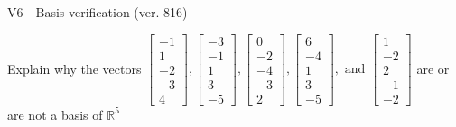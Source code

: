 \begin{exercise}
  \begin{exerciseTitle}V6 - Basis verification (ver. 816)\end{exerciseTitle}
  \begin{exerciseStatement}
    Explain why the vectors \(\left[\begin{array}{r}
-1 \\
1 \\
-2 \\
-3 \\
4
\end{array}\right] , \left[\begin{array}{r}
-3 \\
-1 \\
1 \\
3 \\
-5
\end{array}\right] , \left[\begin{array}{r}
0 \\
-2 \\
-4 \\
-3 \\
2
\end{array}\right] , \left[\begin{array}{r}
6 \\
-4 \\
1 \\
3 \\
-5
\end{array}\right] , \text{ and } \left[\begin{array}{r}
1 \\
-2 \\
2 \\
-1 \\
-2
\end{array}\right]\) are or are not a basis of \(\mathbb{R}^5\)	



\end{exerciseStatement}
\end{exercise}
